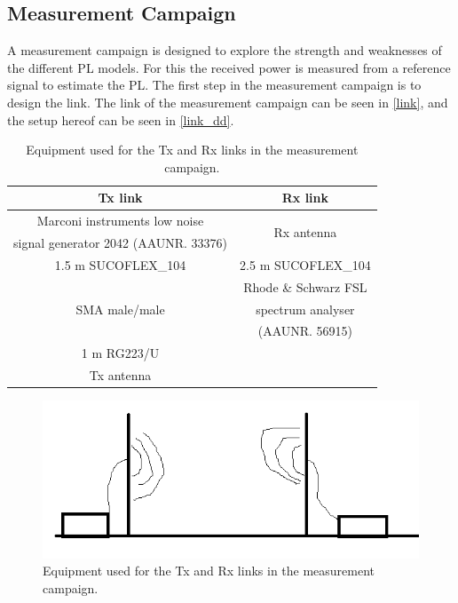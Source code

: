 
\subsection{Measurement Campaign}


A measurement campaign is designed to explore the strength and weaknesses of the different PL models. For this the received power is measured from a reference signal to estimate the PL. The first step in the measurement campaign is to design the link. The link of the measurement campaign can be seen in \autoref{link}, and the setup hereof can be seen in \autoref{link_dd}. 

\begin{table}[!htbp]
\centering
\caption{Equipment used for the Tx and Rx links in the measurement campaign.}
\begin{tabular}{|c|c|}\hline
\textbf{Tx link}&\textbf{Rx link}\\\hline
Marconi instruments low noise & \multirow{2}{*}{Rx antenna} \\
signal generator 2042 (AAUNR. 33376) & \\\hline
1.5 m SUCOFLEX\_104 & 2.5 m SUCOFLEX\_104 \\\hline 
\multirow{3}{*}{SMA male/male} & Rhode \& Schwarz FSL \\
&spectrum analyser \\
& (AAUNR. 56915)\\\hline
1 m RG223/U & \\\hline
Tx antenna &\\\hline
\end{tabular}

\label{link}
\end{table}

\begin{figure}[!htbp]
\centering 
\includegraphics[scale=0.5]{figures/setup.png} 
\caption{Equipment used for the Tx and Rx links in the measurement campaign.}
\label{link_dd}
\end{figure}



